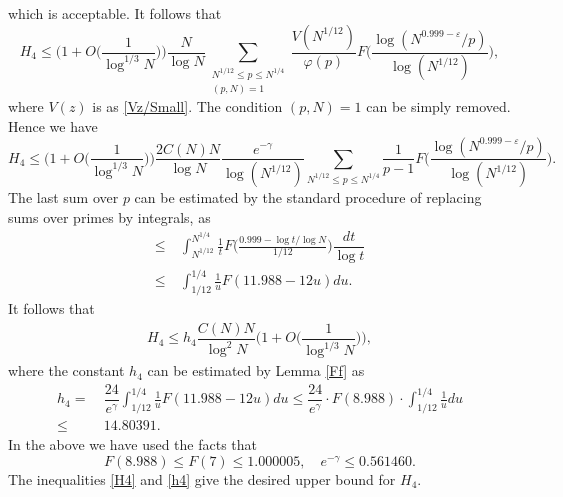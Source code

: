 \documentclass[12pt, a4paper]{amsart}
\def\le{\leqslant}
\theoremstyle{plain}
\theoremstyle{remark}
\numberwithin{equation}{section}
\begin{document}
which is acceptable. It follows that
\begin{equation}
H_4 \le \bigg(1+O\bigg(\dfrac{1}{\log^{1/3}N}\bigg)\bigg) \frac{N}{\log N} \sum_{\substack{N^{1/12} \le p \le N^{1/4} \\ (p, N) = 1}}
\frac{V(N^{1/12})}{\varphi(p)} F\bigg(\frac{\log (N^{0.999-\varepsilon} / p)}{\log (N^{1/12})}\bigg),
\end{equation}
where $V(z)$ is as \eqref{Vz/Small}. The condition $(p,N)=1$ can be simply removed. 
Hence we have
\begin{equation}
H_4 \le \bigg(1+O\bigg(\dfrac{1}{\log^{1/3}N}\bigg)\bigg)\dfrac{2C(N)N}{\log N}
\frac{e^{-\gamma}}{\log (N^{1/12})}\sum_{N^{1/12} \le p \le N^{1/4}}
\frac{1}{p-1} F\bigg(\frac{\log (N^{0.999-\varepsilon} / p)}{\log (N^{1/12})}\bigg).
\end{equation}
The last sum over $p$ can be estimated by the standard procedure of replacing sums over primes by integrals, as
\begin{equation*}
\begin{aligned}
\le\ & \int_{N^{1/12}}^{N^{1/4}} \frac{1}{t}F\bigg(\frac{0.999-\log t/\log N}{1/12}\bigg)\dfrac{dt}{\log t}\\
\le\ & \int_{1/12}^{1/4} \frac{1}{u}F(11.988-12u)du. 
\end{aligned}
\end{equation*}
It follows that 
\begin{equation}\label{H4}
\begin{aligned}
H_4\le h_4\dfrac{C(N)N}{\log^2 N}\bigg(1+O\bigg(\dfrac{1}{\log^{1/3}N}\bigg)\bigg),
\end{aligned}
\end{equation}
where the constant $h_4$ can be estimated by Lemma \ref{Ff} as
\begin{equation}\label{h4}
\begin{aligned}
h_{4}=\ & \dfrac{24}{e^{\gamma}}\int_{1/12}^{1/4} \frac{1}{u}F(11.988-12u)du
\le\dfrac{24}{e^{\gamma}}\cdot F(8.988)\cdot\int_{1/12}^{1/4} \frac{1}{u}du\\
\le\ & 14.80391. 
\end{aligned}
\end{equation}
In the above we have used the facts that 
\begin{equation}\label{F7,E-gamma}
F(8.988)\le F(7)\le 1.000005, \quad e^{-\gamma}\le 0.561460.
\end{equation}
The inequalities \eqref{H4} and \eqref{h4} give the desired upper bound for $H_4$.
\end{document}
